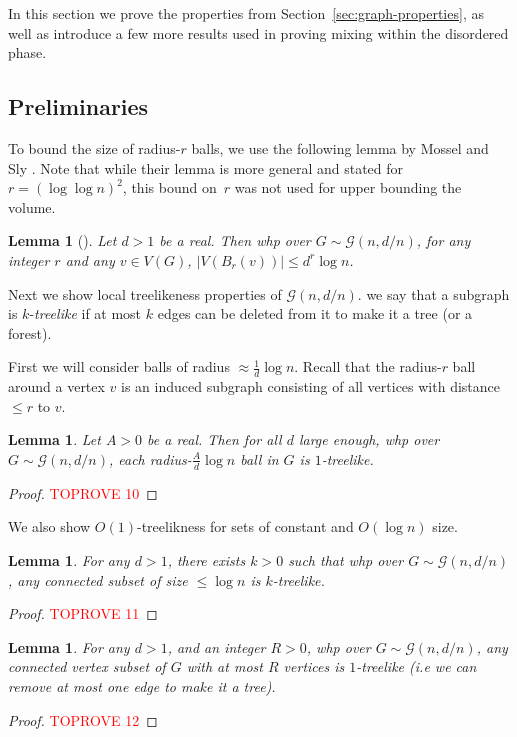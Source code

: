 \documentclass[11pt]{article}
\theoremstyle{plain}
\newtheorem{lemma}[theorem]{Lemma}
\newcommand{\G}{\mathcal{G}}
\newcommand{\1}{\mathbb{1}}
\begin{document}
In this section we prove the properties from Section~\ref{sec:graph-properties}, as well as introduce a few more results used in proving mixing within the disordered phase.


\subsection{Preliminaries}

To bound the size of radius-\(r\) balls, we use the following lemma by Mossel and Sly \cite{MosselSly}. Note that while their lemma is more general and stated for \(r = (\log\log n)^2\), this bound on~$r$ was not used for upper bounding the volume.

\begin{lemma}[{\cite[Lemma 7]{MosselSly}}]\label{lem:ball-size}
    Let \(d > 1\) be a real. Then whp over \(G\sim\G(n,d/n)\), for any integer \(r\) and any \(v\in V(G)\), \(|V(B_r(v))|\leq d^r \log n\).
\end{lemma}

Next we show local treelikeness properties of \(\G(n,d/n)\).
we say that a subgraph is \(k\)-\textit{treelike} if at most \(k\) edges can be deleted from it to make it a tree (or a forest).

First we will consider balls of radius \(\approx \tfrac 1d \log n\). Recall that the radius-\(r\) ball around a vertex \(v\) is an induced subgraph consisting of all vertices with distance \(\leq r\) to \(v\).

\begin{lemma}\label{lem:G-1-treelike}
    Let \(A>0\) be a real. Then for all \(d\) large enough, whp over \(G\sim\G(n, d/n)\), each radius-\(\tfrac Ad\log n\) ball in \(G\) is \(1\)-treelike.
\end{lemma}
\begin{proof}\textcolor{red}{TOPROVE 10}\end{proof}

We also show \(O(1)\)-treelikness for sets of constant and \(O(\log n)\) size.

\begin{lemma}\label{lem:logn-sets-are-treelike}
    For any \(d > 1\), there exists \(k > 0\) such that whp over \(G\sim\G(n,d/n)\), any connected subset of size \(\leq \log n\) is \(k\)-treelike.
\end{lemma}
\begin{proof}\textcolor{red}{TOPROVE 11}\end{proof}

\begin{lemma}\label{lem:1-treelikeness-for-constant-size}
    For any \(d > 1\), and an integer \(R > 0\), whp over \(G\sim\G(n,d/n)\), any connected vertex subset of \(G\) with at most \(R\) vertices is \(1\)-treelike (i.e we can remove at most one edge to make it a tree).
\end{lemma}
\begin{proof}\textcolor{red}{TOPROVE 12}\end{proof}
\end{document}
